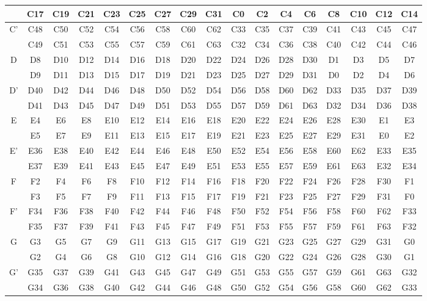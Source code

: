 \documentclass[journal,comsoc]{IEEEtran}
\begin{document}
\begin{small}
\begin{table}[t!]
\begin{threeparttable}
\begin{tabular}{|c||cccccccccccccccc|}
			& C17 & C19 & C21 & C23 & C25 & C27 & C29 & C31 & C0 & C2 & C4 & C6 & C8 & C10 & C12 & C14 \\  
			\hline
			\multirow{2}{*}{C'} & C48 & C50 & C52 & C54 & C56 & C58 & C60 & C62 & C33 & C35 & C37 & C39 & C41 & C43 & C45 & C47 \\  
			& C49 & C51 & C53 & C55 & C57 & C59 & C61 & C63 & C32 & C34 & C36 & C38 & C40 & C42 & C44 & C46 \\  
			\hline
			\multirow{2}{*}{D} & D8 & D10 & D12 & D14 & D16 & D18 & D20 & D22 & D24 & D26 & D28 & D30 & D1 & D3 & D5 & D7 \\  
			& D9 & D11 & D13 & D15 & D17 & D19 & D21 & D23 & D25 & D27 & D29 & D31 & D0 & D2 & D4 & D6 \\  
			\hline
			\multirow{2}{*}{D'} & D40 & D42 & D44 & D46 & D48 & D50 & D52 & D54 & D56 & D58 & D60 & D62 & D33 & D35 & D37 & D39 \\  
			& D41 & D43 & D45 & D47 & D49 & D51 & D53 & D55 & D57 & D59 & D61 & D63 & D32 & D34 & D36 & D38 \\  
			\hline
			\multirow{2}{*}{E} & E4 & E6 & E8 & E10 & E12 & E14 & E16 & E18 & E20 & E22 & E24 & E26 & E28 & E30 & E1 & E3 \\  
			& E5 & E7 & E9 & E11 & E13 & E15 & E17 & E19 & E21 & E23 & E25 & E27 & E29 & E31 & E0 & E2 \\  
			\hline
			\multirow{2}{*}{E'} & E36 & E38 & E40 & E42 & E44 & E46 & E48 & E50 & E52 & E54 & E56 & E58 & E60 & E62 & E33 & E35 \\  
			& E37 & E39 & E41 & E43 & E45 & E47 & E49 & E51 & E53 & E55 & E57 & E59 & E61 & E63 & E32 & E34 \\  
			\hline
			\multirow{2}{*}{F} & F2 & F4 & F6 & F8 & F10 & F12 & F14 & F16 & F18 & F20 & F22 & F24 & F26 & F28 & F30 & F1 \\  
			& F3 & F5 & F7 & F9 & F11 & F13 & F15 & F17 & F19 & F21 & F23 & F25 & F27 & F29 & F31 & F0 \\  
			\hline
			\multirow{2}{*}{F'} & F34 & F36 & F38 & F40 & F42 & F44 & F46 & F48 & F50 & F52 & F54 & F56 & F58 & F60 & F62 & F33 \\  
			& F35 & F37 & F39 & F41 & F43 & F45 & F47 & F49 & F51 & F53 & F55 & F57 & F59 & F61 & F63 & F32 \\  
			\hline
			\multirow{2}{*}{G} & G3 & G5 & G7 & G9 & G11 & G13 & G15 & G17 & G19 & G21 & G23 & G25 & G27 & G29 & G31 & G0 \\  
			& G2 & G4 & G6 & G8 & G10 & G12 & G14 & G16 & G18 & G20 & G22 & G24 & G26 & G28 & G30 & G1 \\  
			\hline
			\multirow{2}{*}{G'} & G35 & G37 & G39 & G41 & G43 & G45 & G47 & G49 & G51 & G53 & G55 & G57 & G59 & G61 & G63 & G32 \\  
			& G34 & G36 & G38 & G40 & G42 & G44 & G46 & G48 & G50 & G52 & G54 & G56 & G58 & G60 & G62 & G33 \\
			\hline
		\end{tabular}
	\end{threeparttable}
\end{table}
\end{small}
\end{document}
